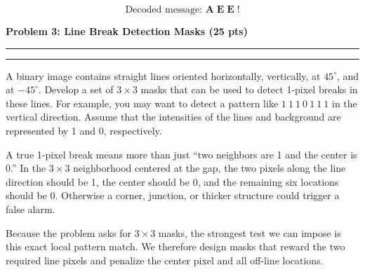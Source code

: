 \documentclass[12pt]{article}
\newcommand{\question}[1]{%
  \clearpage
  \vspace{0.5cm}
  {\noindent\normalsize \textbf{#1}}
  \vspace{0.2cm}
  \hrule
  \vspace{0.1cm}
  \hrule
  \vspace{0.3cm}
}
\begin{document}
\begin{resultsbox}
\[
\boxed{\text{Decoded message: } \mathbf{A\;E\;E\;!}}
\]
\end{resultsbox}



\question{Problem 3: Line Break Detection Masks (25 pts)}\label{quest:3}

A binary image contains straight lines oriented horizontally, vertically, at $45^\circ$, and at $-45^\circ$.
Develop a set of $3 \times 3$ masks that can be used to detect 1-pixel breaks in these lines. For example,
you may want to detect a pattern like $1\ 1\ 1\ 0\ 1\ 1\ 1$ in the vertical direction. Assume that the
intensities of the lines and background are represented by 1 and 0, respectively.

\vspace{0.4cm}

\begin{stepbox}
A true 1-pixel break means more than just ``two neighbors are 1 and the center is 0.'' In the $3 \times 3$ neighborhood centered at the gap, the two pixels along the line direction should be 1, the center should be 0, and the remaining six locations should be 0. Otherwise a corner, junction, or thicker structure could trigger a false alarm.

Because the problem asks for $3 \times 3$ masks, the strongest test we can impose is this exact local pattern match. We therefore design masks that reward the two required line pixels and penalize the center pixel and all off-line locations.
\end{stepbox}
\end{document}
